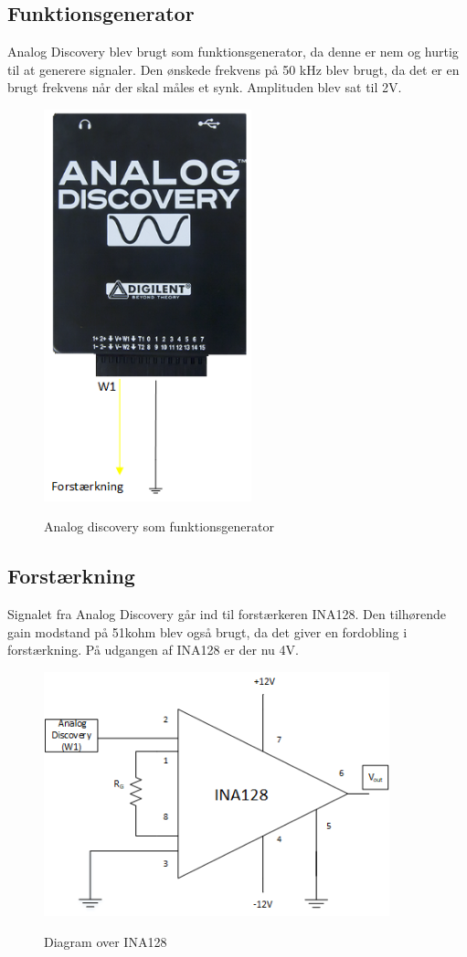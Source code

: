 \subsection{Funktionsgenerator}
Analog Discovery blev brugt som funktionsgenerator, da denne er nem og hurtig til at generere signaler. Den ønskede frekvens på 50 kHz blev brugt, da det er en brugt frekvens når der skal måles et synk\cite{Kusuhara2004}. Amplituden blev sat til 2V. 

\begin{figure}[H]
\centering
{\includegraphics[width=6cm]
{Figure/analogdis}}
\caption{Analog discovery som funktionsgenerator}
\label{fig:analogdis}
\end{figure}


\subsection{Forstærkning}
Signalet fra Analog Discovery går ind til forstærkeren INA128. Den tilhørende gain modstand på 51kohm blev også brugt, da det giver en fordobling i forstærkning. På udgangen af INA128 er der nu 4V.

\begin{figure}[H]
\centering
{\includegraphics[width=10cm]
{Figure/ina128}}
\caption{Diagram over INA128}
\label{fig:ina128}
\end{figure}



